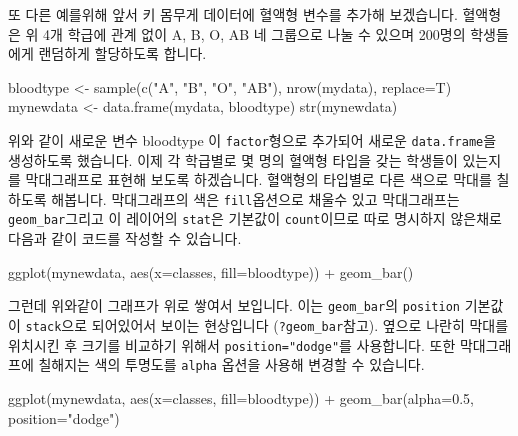 \documentclass[
]{book}
\newenvironment{Shaded}{\begin{snugshade}}{\end{snugshade}}
\newcommand{\AttributeTok}[1]{\textcolor[rgb]{0.77,0.63,0.00}{#1}}
\newcommand{\FloatTok}[1]{\textcolor[rgb]{0.00,0.00,0.81}{#1}}
\newcommand{\FunctionTok}[1]{\textcolor[rgb]{0.00,0.00,0.00}{#1}}
\newcommand{\NormalTok}[1]{#1}
\newcommand{\OtherTok}[1]{\textcolor[rgb]{0.56,0.35,0.01}{#1}}
\newcommand{\SpecialCharTok}[1]{\textcolor[rgb]{0.00,0.00,0.00}{#1}}
\newcommand{\StringTok}[1]{\textcolor[rgb]{0.31,0.60,0.02}{#1}}
\begin{document}
또 다른 예를위해 앞서 키 몸무게 데이터에 혈액형 변수를 추가해 보겠습니다. 혈액형은 위 4개 학급에 관계 없이 A, B, O, AB 네 그룹으로 나눌 수 있으며 200명의 학생들에게 랜덤하게 할당하도록 합니다.

\begin{Shaded}
\begin{Highlighting}[]
\NormalTok{bloodtype }\OtherTok{\textless{}{-}} \FunctionTok{sample}\NormalTok{(}\FunctionTok{c}\NormalTok{(}\StringTok{"A"}\NormalTok{, }\StringTok{"B"}\NormalTok{, }\StringTok{"O"}\NormalTok{, }\StringTok{"AB"}\NormalTok{), }\FunctionTok{nrow}\NormalTok{(mydata), }\AttributeTok{replace=}\NormalTok{T)}
\NormalTok{mynewdata }\OtherTok{\textless{}{-}} \FunctionTok{data.frame}\NormalTok{(mydata, bloodtype)}
\FunctionTok{str}\NormalTok{(mynewdata)}
\end{Highlighting}
\end{Shaded}

위와 같이 새로운 변수 bloodtype 이 \texttt{factor}형으로 추가되어 새로운 \texttt{data.frame}을 생성하도록 했습니다. 이제 각 학급별로 몇 명의 혈액형 타입을 갖는 학생들이 있는지를 막대그래프로 표현해 보도록 하겠습니다. 혈액형의 타입별로 다른 색으로 막대를 칠하도록 해봅니다. 막대그래프의 색은 \texttt{fill}옵션으로 채울수 있고 막대그래프는 \texttt{geom\_bar}그리고 이 레이어의 \texttt{stat}은 기본값이 \texttt{count}이므로 따로 명시하지 않은채로 다음과 같이 코드를 작성할 수 있습니다.

\begin{Shaded}
\begin{Highlighting}[]
\FunctionTok{ggplot}\NormalTok{(mynewdata, }\FunctionTok{aes}\NormalTok{(}\AttributeTok{x=}\NormalTok{classes, }\AttributeTok{fill=}\NormalTok{bloodtype)) }\SpecialCharTok{+}
  \FunctionTok{geom\_bar}\NormalTok{()}
\end{Highlighting}
\end{Shaded}

그런데 위와같이 그래프가 위로 쌓여서 보입니다. 이는 \texttt{geom\_bar}의 \texttt{position} 기본값이 \texttt{stack}으로 되어있어서 보이는 현상입니다 (\texttt{?geom\_bar}참고). 옆으로 나란히 막대를 위치시킨 후 크기를 비교하기 위해서 \texttt{position="dodge"}를 사용합니다. 또한 막대그래프에 칠해지는 색의 투명도를 \texttt{alpha} 옵션을 사용해 변경할 수 있습니다.

\begin{Shaded}
\begin{Highlighting}[]
\FunctionTok{ggplot}\NormalTok{(mynewdata, }\FunctionTok{aes}\NormalTok{(}\AttributeTok{x=}\NormalTok{classes, }\AttributeTok{fill=}\NormalTok{bloodtype)) }\SpecialCharTok{+}
  \FunctionTok{geom\_bar}\NormalTok{(}\AttributeTok{alpha=}\FloatTok{0.5}\NormalTok{, }\AttributeTok{position=}\StringTok{"dodge"}\NormalTok{)}
\end{Highlighting}
\end{Shaded}
\end{document}

